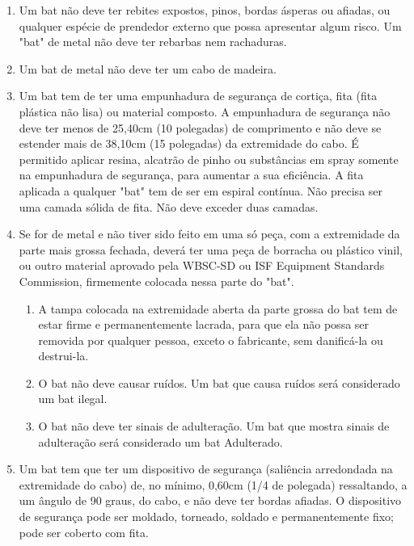 \begin{multicols}{2}
\begin{enumerate}[label= \arabic*)]
		\item  Um \gls{bat} n\~ao deve ter rebites expostos, pinos, bordas \'asperas ou afiadas, ou qualquer esp\'ecie de prendedor externo que possa apresentar algum risco. Um "bat" de metal n\~ao deve ter rebarbas nem rachaduras.
		\item  Um \gls{bat} de metal n\~ao deve ter um cabo de madeira.
		\item  Um \gls{bat} tem de ter uma empunhadura de seguran\c{c}a de corti\c{c}a, fita (fita pl\'astica n\~ao lisa) ou material composto. A empunhadura de seguran\c{c}a n\~ao deve ter menos de 25,40cm (10 polegadas) de comprimento e n\~ao deve se estender mais de 38,10cm (15 polegadas) da extremidade do cabo. É permitido aplicar resina, alcatr\~ao de pinho ou subst\^ancias em spray somente na empunhadura de seguran\c{c}a, para aumentar a sua efici\^encia. A fita aplicada a qualquer "bat" tem de ser em espiral contínua. N\~ao precisa ser uma camada s\'olida de fita. N\~ao deve exceder duas camadas.
		\item  Se for de metal e n\~ao tiver sido feito em uma s\'o pe\c{c}a, com a extremidade da parte mais grossa fechada, dever\'a ter uma pe\c{c}a de borracha ou pl\'astico vinil, ou outro material aprovado pela WBSC-SD ou ISF Equipment Standards Commission, firmemente colocada nessa parte do "bat".

		\begin{enumerate}[label=\roman*.]
			\item A tampa colocada na extremidade aberta da parte grossa do \gls{bat} tem de estar firme e permanentemente lacrada, para que ela n\~ao possa ser removida por qualquer pessoa, exceto o fabricante, sem danific\'a-la ou destrui-la.
			\item O \gls{bat} n\~ao deve causar ruídos. Um \gls{bat} que causa ruídos ser\'a considerado um \gls{bat} ilegal.
			\item O \gls{bat} n\~ao deve ter sinais de adultera\c{c}\~ao. Um \gls{bat} que mostra sinais de adultera\c{c}\~ao ser\'a considerado um \gls{bat} Adulterado.
		\end{enumerate}
		\item  Um \gls{bat} tem que ter um dispositivo de seguran\c{c}a (sali\^encia arredondada na extremidade do cabo) de, no mínimo, 0,60cm (1/4 de polegada) ressaltando, a um \^angulo de 90 graus, do cabo, e n\~ao deve ter bordas afiadas. O dispositivo de seguran\c{c}a pode ser moldado, torneado, soldado e permanentemente fixo; pode ser coberto com fita.


\end{enumerate}
\end{multicols}
